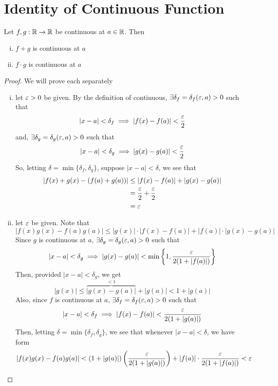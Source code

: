 \section{Identity of Continuous Function}

\begin{lemma}
    Let $f, g: \mathbb R \rightarrow \mathbb R$ be continuous at $a \in \mathbb R$. Then
    \begin{enumerate}[(i)]
        \item $f+g$ is continuous at $a$
        \item $f\cdot g$ is continuous at $a$
    \end{enumerate}
\end{lemma}
\begin{proof}
    We will prove each separately
    \begin{enumerate}[(i)]
        \item let $\varepsilon > 0$ be given. By the definition of continuous, $\exists \delta_f = \delta_f(\varepsilon, a) > 0$ such that 
        $$|x-a| < \delta_f \implies |f(x) - f(a)| < \frac{\varepsilon}{2}$$
        and, $\exists \delta_g = \delta_g(\varepsilon, a) > 0$ such that 
        $$|x-a| < \delta_g \implies |g(x) - g(a)| < \frac{\varepsilon}{2}$$
        So, letting $\delta = \min\{\delta_f, \delta_g\}$, suppose $|x-a| < \delta$, we see that 
        \begin{align*}
            |f(x) + g(x) - (f(a) + g(a))| &\leq |f(x) - f(a)| + |g(x) - g(a)| \\
            &= \frac{\varepsilon}{2} + \frac{\varepsilon}{2} \\
            &= \varepsilon
        \end{align*}
        \item let $\varepsilon$ be given. Note that
        $$|f(x)g(x)-f(a)g(a)| \leq |g(x)|\cdot|f(x)-f(a)| + |f(a)|\cdot|g(x)-g(a)|$$
        Since $g$ is continuous at $a$, $\exists \delta_g = \delta_g(\varepsilon, a) > 0$ such that
        $$|x-a| < \delta_g \implies |g(x)-g(a)| < \min\left\{1, \frac{\varepsilon}{2(1 + |f(a)|)}\right\}$$
        Then, provided $|x-a| < \delta_g$, we get 
        $$|g(x)| \leq \overbrace{|g(x)-g(a)|}^{<1} + |g(a)| < 1 + |g(a)|$$
        Also, since $f$ is continuous at $a$, $\exists \delta_f = \delta_f(\varepsilon, a) > 0$ such that
        $$|x-a| < \delta_f \implies |f(x) - f(a)| < \frac{\varepsilon}{2(1 + |g(a)|)}$$
        Then, letting $\delta = \min\{\delta_f, \delta_g\}$, we see that whenever $|x-a| < \delta$, we have form
        $$|f(x)g(x) - f(a)g(a)| < (1 + |g(a)|)\left(\frac{\varepsilon}{2(1 + |g(a)|)}\right) + |f(a)|\cdot\frac{\varepsilon}{2(1 + |f(a)|)} < \varepsilon$$
    \end{enumerate}
\end{proof}

